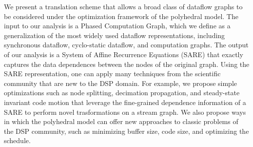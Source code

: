 We present a translation scheme that allows a broad class of dataflow
graphs to be considered under the optimization framework of the
polyhedral model.  The input to our analysis is a Phased Computation
Graph, which we define as a generalization of the most widely used
dataflow representations, including synchronous dataflow, cyclo-static
dataflow, and computation graphs.  The output of our analysis is a
System of Affine Recurrence Equations (SARE) that exactly captures the
data dependences between the nodes of the original graph.  Using the
SARE representation, one can apply many techniques from the scientific
community that are new to the DSP domain.  For example, we propose
simple optimizations such as node splitting, decimation propagation,
and steady-state invariant code motion that leverage the fine-grained
dependence information of a SARE to perform novel trasformations on a
stream graph.  We also propose ways in which the polyhedral model can
offer new approaches to classic problems of the DSP community, such as
minimizing buffer size, code size, and optimizing the schedule.